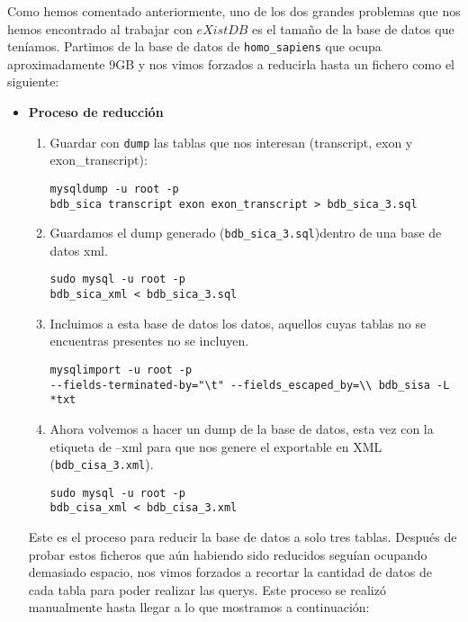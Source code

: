 \documentclass[12pt,a4paper]{article}
\begin{document}
Como hemos comentado anteriormente, uno de los dos grandes problemas que nos hemos encontrado al trabajar con $eXistDB$ es el tamaño de la base de datos que teníamos. Partimos de la base de datos de \verb|homo_sapiens| que ocupa aproximadamente 9GB y nos vimos forzados a reducirla hasta un fichero como el siguiente:

\begin{itemize}

\item \textbf{Proceso de reducción}

\begin{enumerate}

\item Guardar con \verb|dump| las tablas que nos interesan (transcript, exon y exon\_transcript):

\begin{verbatim}
mysqldump -u root -p 
bdb_sica transcript exon exon_transcript > bdb_sica_3.sql
\end{verbatim}


\item Guardamos el dump generado (\verb|bdb_sica_3.sql|)dentro de una base de datos xml.
\begin{verbatim}
sudo mysql -u root -p 
bdb_sica_xml < bdb_sica_3.sql
\end{verbatim}

\item Incluimos a esta base de datos los datos, aquellos cuyas tablas no se encuentras presentes no se incluyen. 
\begin{verbatim}
mysqlimport -u root -p 
--fields-terminated-by="\t" --fields_escaped_by=\\ bdb_sisa -L *txt
\end{verbatim}


\item Ahora volvemos a hacer un dump de la base de datos, esta vez con la etiqueta de --xml para que nos genere el exportable en XML (\verb|bdb_cisa_3.xml|).

\begin{verbatim}
sudo mysql -u root -p 
bdb_cisa_xml < bdb_cisa_3.xml
\end{verbatim}
\end{enumerate}

Este es el proceso para reducir la base de datos a solo tres tablas. Después de probar estos ficheros que aún habiendo sido reducidos seguían ocupando demasiado espacio, nos vimos forzados a recortar la cantidad de datos de cada tabla para poder realizar las querys. Este proceso se realizó manualmente hasta llegar a lo que mostramos a continuación:



\end{itemize}
\end{document}
